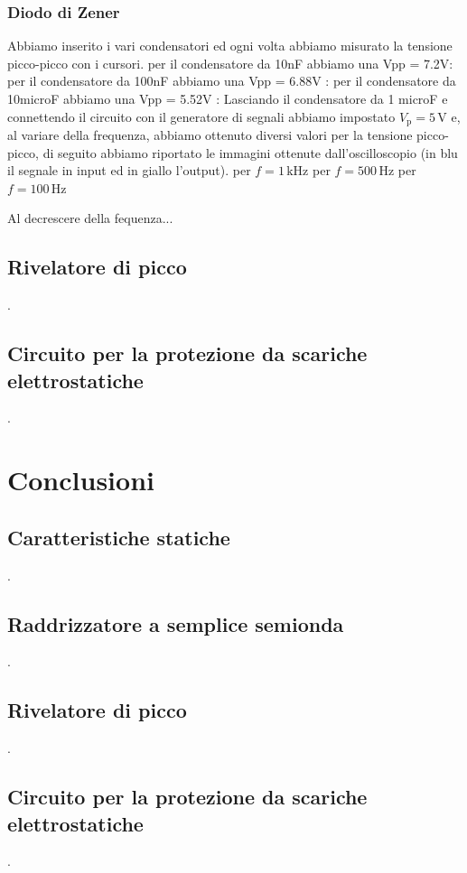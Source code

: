 \documentclass[a4paper]{article}
\begin{document}
			\subsubsection{Diodo di Zener}	
				Abbiamo inserito i vari condensatori ed ogni volta abbiamo misurato la tensione picco-picco con i cursori.
				per il condensatore da 10nF abbiamo una Vpp = 7.2V:
				per il condensatore da 100nF abbiamo una Vpp = 6.88V :
				per il condensatore da 10microF abbiamo una Vpp = 5.52V :
			Lasciando il condensatore da 1 microF e connettendo il circuito con il generatore di segnali abbiamo impostato $ V_{\mathrm{p}} = 5 \, \mathrm{V} $ e, al variare della frequenza, abbiamo ottenuto diversi valori per la tensione picco-picco, di seguito abbiamo riportato le immagini ottenute dall'oscilloscopio (in blu il segnale in input ed in giallo l'output).
			per $ f = 1 \, \mathrm{kHz} $
			per $ f = 500 \, \mathrm{Hz} $
			per $ f = 100 \, \mathrm{Hz} $
			
			Al decrescere della fequenza...
			
		\subsection{Rivelatore di picco}
			.
		\subsection{Circuito per la protezione da scariche elettrostatiche}
			.
	\section{Conclusioni}
		\subsection{Caratteristiche statiche}
			.
		\subsection{Raddrizzatore a semplice semionda}
			.
		\subsection{Rivelatore di picco}
			.
		\subsection{Circuito per la protezione da scariche elettrostatiche}
			.
\end{document}
